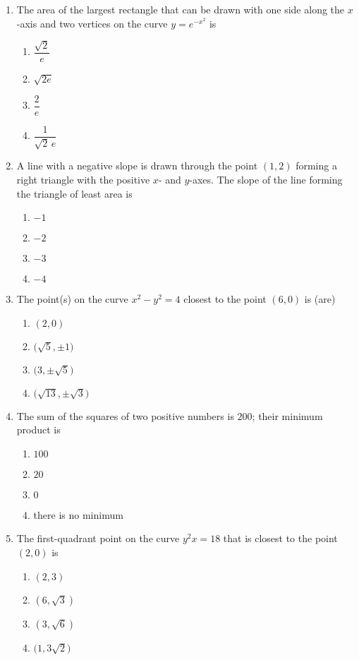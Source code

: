 \documentclass[12pt]{article}
\begin{document}
\begin{enumerate}[label=\textbf{A\arabic*.},resume]
\item The area of the largest rectangle that can be drawn with one side along the $x$-axis and two vertices on the curve $y=e^{-x^{2}}$ is
\begin{enumerate}[label=(\Alph*)]
\item $\dfrac{\sqrt{2}}{e}$ \item $\sqrt{2e}$ \item $\dfrac{2}{e}$ \item $\dfrac{1}{\sqrt{2}\,e}$
\end{enumerate}

\item A line with a negative slope is drawn through the point $(1,2)$ forming a right triangle with the positive $x$- and $y$-axes. The slope of the line forming the triangle of least area is
\begin{enumerate}[label=(\Alph*)]
\item $-1$ \item $-2$ \item $-3$ \item $-4$
\end{enumerate}

\item The point(s) on the curve $x^{2}-y^{2}=4$ closest to the point $(6,0)$ is (are)
\begin{enumerate}[label=(\Alph*)]
\item $(2,0)$ \item $\bigl(\sqrt{5},\pm 1\bigr)$ \item $\bigl(3,\pm\sqrt{5}\bigr)$ \item $\bigl(\sqrt{13},\pm\sqrt{3}\bigr)$
\end{enumerate}

\item The sum of the squares of two positive numbers is $200$; their minimum product is
\begin{enumerate}[label=(\Alph*)]
\item $100$ \item $20$ \item $0$ \item there is no minimum
\end{enumerate}

\item The first-quadrant point on the curve $y^{2}x=18$ that is closest to the point $(2,0)$ is
\begin{enumerate}[label=(\Alph*)]
\item $(2,3)$ \item $(6,\sqrt{3})$ \item $(3,\sqrt{6})$ \item $\bigl(1,3\sqrt{2}\bigr)$
\end{enumerate}


\end{enumerate}
\end{document}
